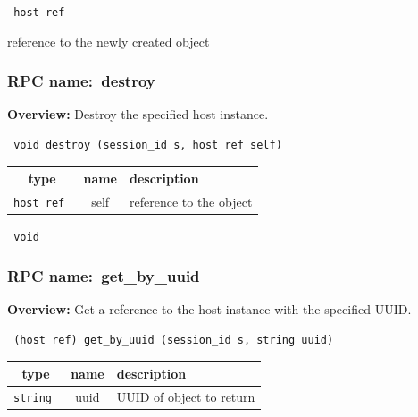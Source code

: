 \vspace{0.3cm}

{\tt 
host ref
}


reference to the newly created object
\vspace{0.3cm}
\vspace{0.3cm}
\vspace{0.3cm}
\subsubsection{RPC name:~destroy}

{\bf Overview:} 
Destroy the specified host instance.

\begin{verbatim} void destroy (session_id s, host ref self)\end{verbatim}



 
\vspace{0.3cm}
\begin{tabular}{|c|c|p{7cm}|}
 \hline
{\bf type} & {\bf name} & {\bf description} \\ \hline
{\tt host ref } & self & reference to the object \\ \hline 

\end{tabular}

\vspace{0.3cm}

{\tt 
void
}



\vspace{0.3cm}
\vspace{0.3cm}
\vspace{0.3cm}
\subsubsection{RPC name:~get\_by\_uuid}

{\bf Overview:} 
Get a reference to the host instance with the specified UUID.

\begin{verbatim} (host ref) get_by_uuid (session_id s, string uuid)\end{verbatim}



 
\vspace{0.3cm}
\begin{tabular}{|c|c|p{7cm}|}
 \hline
{\bf type} & {\bf name} & {\bf description} \\ \hline
{\tt string } & uuid & UUID of object to return \\ \hline 

\end{tabular}

